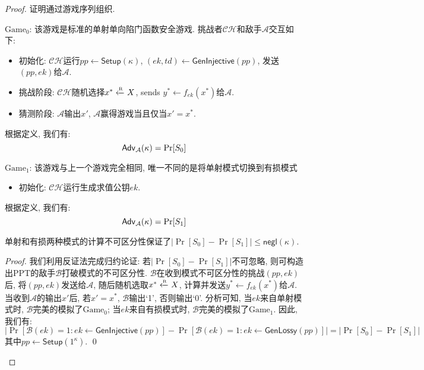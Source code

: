 \begin{proof}
证明通过游戏序列组织. 
\begin{trivlist}
\item $\text{Game}_0$: 该游戏是标准的单射单向陷门函数安全游戏. 挑战者$\mathcal{CH}$和敌手$\mathcal{A}$交互如下:
\begin{itemize}
\item 初始化: $\mathcal{CH}$运行$pp \leftarrow \mathsf{Setup}(\kappa)$, 
    $(ek, td) \leftarrow \mathsf{GenInjective}(pp)$, 发送$(pp, ek)$给$\mathcal{A}$. 

\item 挑战阶段: $\mathcal{CH}$随机选择$x^* \xleftarrow{\textup{\tiny R}} X$, sends $y^* \leftarrow f_{ek}(x^*)$给$\mathcal{A}$. 
    
\item 猜测阶段: $\mathcal{A}$输出$x'$, $\mathcal{A}$赢得游戏当且仅当$x' = x^*$. 
\end{itemize}
根据定义, 我们有: 
\begin{equation*}
	\mathsf{Adv}_\mathcal{A}(\kappa) = \Pr[S_0]
\end{equation*}

\item $\text{Game}_1$: 该游戏与上一个游戏完全相同, 唯一不同的是将单射模式切换到有损模式 
\begin{itemize}
\item 初始化: $\mathcal{CH}$运行生成求值公钥$ek$. 
\end{itemize}
根据定义, 我们有: 
\begin{equation*}
	\mathsf{Adv}_\mathcal{A}(\kappa) = \Pr[S_1]
\end{equation*}
\end{trivlist}

\begin{claim}
单射和有损两种模式的计算不可区分性保证了$|\Pr[S_0] - \Pr[S_1]| \leq \mathsf{negl}(\kappa)$.  
\end{claim}

\begin{proof}
我们利用反证法完成归约论证: 若$|\Pr[S_0] - \Pr[S_1]|$不可忽略, 则可构造出PPT的敌手$\mathcal{B}$打破模式的不可区分性. 
$\mathcal{B}$在收到模式不可区分性的挑战$(pp, ek)$后, 将$(pp, ek)$发送给$\mathcal{A}$, 
随后随机选取$x^* \xleftarrow{\textup{\tiny R}} X$, 计算并发送$y^* \leftarrow f_{ek}(x^*)$给$\mathcal{A}$. 
当收到$\mathcal{A}$的输出$x'$后, 若$x' = x^*$, $\mathcal{B}$输出`1', 否则输出`0'. 
分析可知, 当$ek$来自单射模式时, $\mathcal{B}$完美的模拟了$\text{Game}_0$; 
当$ek$来自有损模式时, $\mathcal{B}$完美的模拟了$\text{Game}_1$. 
因此, 我们有: 
\begin{equation*}
|\Pr[\mathcal{B}(ek)=1: ek \leftarrow \mathsf{GenInjective}(pp)] - 
\Pr[\mathcal{B}(ek)=1: ek \leftarrow \mathsf{GenLossy}(pp)]| = |\Pr[S_0] - \Pr[S_1]| 
\end{equation*} 
其中$pp \leftarrow \mathsf{Setup}(1^\kappa)$. \qed
\end{proof}


\end{proof}

